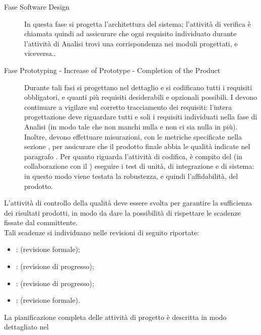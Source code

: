\begin{description}
		\item[Fase Software Design] In questa fase si progetta l'architettura del sistema; l'attività di verifica è chiamata quindi ad assicurare che ogni requisito individuato durante l'attività di Analisi trovi una corrispondenza nei moduli progettati, e viceversa..\\
		\item[Fase Prototyping - Increase of Prototype - Completion of the Product] Durante tali fasi si progettano nel dettaglio e si codificano tutti i requisiti obbligatori, e quanti più requisiti desiderabili e opzionali possibili.
		I  devono continuare a vigilare sul corretto tracciamento dei requisiti: l'intera progettazione deve riguardare tutti e soli i requisiti individuati nella fase di Analisi (in modo tale che non manchi nulla e non ci sia nulla in più). Inoltre, devono effettuare misurazioni, con le metriche specificate nella sezione , per assicurare che il prodotto finale abbia le qualità indicate nel paragrafo .
		Per quanto riguarda l'attività di codifica, è compito del  (in collaborazione con il ) eseguire i test di unità, di 
		integrazione e di sistema: in questo modo viene testata la robustezza, e quindi l'affidabilità, del prodotto.\\
		\end{description}
			L'attività di controllo della qualità deve essere svolta per garantire la sufficienza dei risultati prodotti, in modo da dare la possibilità di rispettare le scadenze fissate dal committente.\\
			Tali scadenze si individuano nelle revisioni di seguito riportate:
			\begin{itemize}
				\item {}:  (revisione formale);
				\item {}:  (revisione di progresso);
				\item {}:  (revisione di progresso);
				\item {}:  (revisione formale).
			\end{itemize}
			La pianificazione completa delle attività di progetto è descritta in modo dettagliato nel 
		 \label{subsec:responsabilita}
